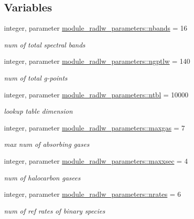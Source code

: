 \subsection*{Variables}
\begin{DoxyCompactItemize}
\item 
integer, parameter \hyperlink{group__module__radlw__main_ga48e11b992a80595d71c92f7c9bfbe19c}{module\+\_\+radlw\+\_\+parameters\+::nbands} = 16
\begin{DoxyCompactList}\small\item\em num of total spectral bands \end{DoxyCompactList}\item 
integer, parameter \hyperlink{group__module__radlw__main_ga05fe17fe932ce62a3ae2c6c564584321}{module\+\_\+radlw\+\_\+parameters\+::ngptlw} = 140
\begin{DoxyCompactList}\small\item\em num of total g-\/points \end{DoxyCompactList}\item 
integer, parameter \hyperlink{group__module__radlw__main_ga61ae33b9db5bac9962f72e2a0db3c0e4}{module\+\_\+radlw\+\_\+parameters\+::ntbl} = 10000
\begin{DoxyCompactList}\small\item\em lookup table dimension \end{DoxyCompactList}\item 
integer, parameter \hyperlink{group__module__radlw__main_ga01330b4ad09907f2db51cb516ed21033}{module\+\_\+radlw\+\_\+parameters\+::maxgas} = 7
\begin{DoxyCompactList}\small\item\em max num of absorbing gases \end{DoxyCompactList}\item 
integer, parameter \hyperlink{group__module__radlw__main_ga5817221936731c6ee6443da6a64e934e}{module\+\_\+radlw\+\_\+parameters\+::maxxsec} = 4
\begin{DoxyCompactList}\small\item\em num of halocarbon gasees \end{DoxyCompactList}\item 
integer, parameter \hyperlink{group__module__radlw__main_ga86288e4bbe3d6962505488790ff42bfa}{module\+\_\+radlw\+\_\+parameters\+::nrates} = 6
\begin{DoxyCompactList}\small\item\em num of ref rates of binary species \end{DoxyCompactList}\item 

\end{DoxyCompactItemize}
